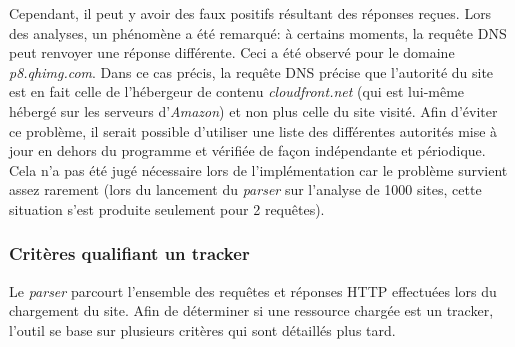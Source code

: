 %	

%	


Cependant, il peut y avoir des faux positifs résultant des réponses reçues. Lors des analyses, un phénomène a été remarqué: à certains moments, la requête DNS peut renvoyer une réponse différente. Ceci a été observé pour le domaine \textit{p8.qhimg.com}. %
Dans ce cas précis, la requête DNS précise que l'autorité du site est en fait celle de l'hébergeur de contenu \textit{cloudfront.net} (qui est lui-même hébergé sur les serveurs d'\textit{Amazon}) et non plus celle du site visité. Afin d'éviter ce problème, il serait possible d'utiliser une liste des différentes autorités mise à jour en dehors du programme et vérifiée de façon indépendante et périodique. Cela n'a pas été jugé nécessaire lors de l'implémentation car le problème survient assez rarement (lors du lancement du \textit{parser} sur l'analyse de 1000 sites, cette situation s'est produite seulement pour 2 requêtes).

%	

%	

\subsubsection{Critères qualifiant un tracker}
Le \textit{parser} parcourt l'ensemble des requêtes et réponses HTTP effectuées lors du chargement du site. Afin de déterminer si une ressource chargée est un tracker, l'outil se base sur plusieurs critères qui sont détaillés plus tard.
\newline

